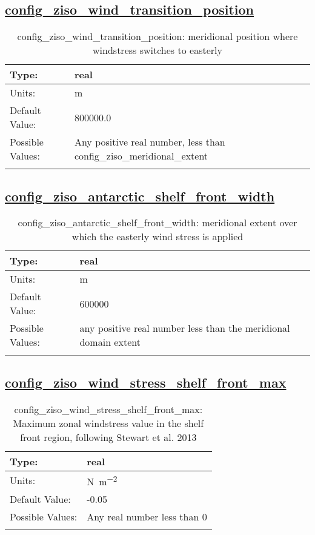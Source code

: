 \subsection[config\_ziso\_wind\_transition\_position]{\hyperref[sec:nm_tab_ziso]{config\_ziso\_wind\_transition\_position}}
\label{subsec:nm_sec_config_ziso_wind_transition_position}
\begin{center}
\begin{longtable}{| p{2.0in} || p{4.0in} |}
    \hline
    Type: & real \\
    \hline
    Units: & \si{m} \\
    \hline
    Default Value: & 800000.0 \\
    \hline
    Possible Values: & Any positive real number, less than config\_ziso\_meridional\_extent \\
    \hline
    \caption{config\_ziso\_wind\_transition\_position: meridional position where windstress switches to easterly}
\end{longtable}
\end{center}
\subsection[config\_ziso\_antarctic\_shelf\_front\_width]{\hyperref[sec:nm_tab_ziso]{config\_ziso\_antarctic\_shelf\_front\_width}}
\label{subsec:nm_sec_config_ziso_antarctic_shelf_front_width}
\begin{center}
\begin{longtable}{| p{2.0in} || p{4.0in} |}
    \hline
    Type: & real \\
    \hline
    Units: & \si{m} \\
    \hline
    Default Value: & 600000 \\
    \hline
    Possible Values: & any positive real number less than the meridional domain extent \\
    \hline
    \caption{config\_ziso\_antarctic\_shelf\_front\_width: meridional extent over which the easterly wind stress is applied}
\end{longtable}
\end{center}
\subsection[config\_ziso\_wind\_stress\_shelf\_front\_max]{\hyperref[sec:nm_tab_ziso]{config\_ziso\_wind\_stress\_shelf\_front\_max}}
\label{subsec:nm_sec_config_ziso_wind_stress_shelf_front_max}
\begin{center}
\begin{longtable}{| p{2.0in} || p{4.0in} |}
    \hline
    Type: & real \\
    \hline
    Units: & \si{N.m^{-2}} \\
    \hline
    Default Value: & -0.05 \\
    \hline
    Possible Values: & Any real number less than 0 \\
    \hline
    \caption{config\_ziso\_wind\_stress\_shelf\_front\_max: Maximum zonal windstress value in the shelf front region, following Stewart et al. 2013}
\end{longtable}
\end{center}
